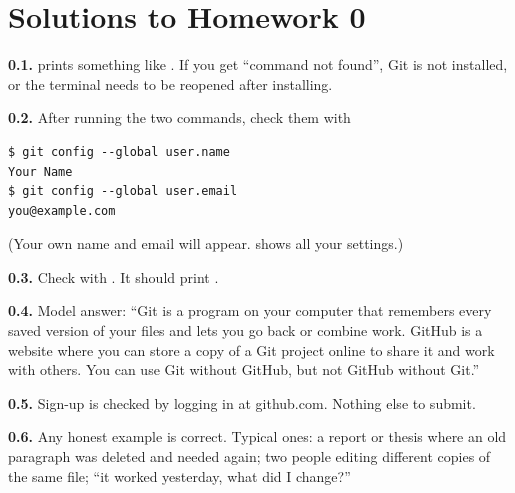 \section*{Solutions to Homework 0}

\textbf{0.1.}  prints something like . If you get ``command not found'', Git is not installed, or the terminal needs to be reopened after installing.

\textbf{0.2.} After running the two commands, check them with
\begin{lstlisting}
$ git config --global user.name
Your Name
$ git config --global user.email
you@example.com
\end{lstlisting}
(Your own name and email will appear.  shows all your settings.)

\textbf{0.3.} Check with . It should print .

\textbf{0.4.} Model answer: ``Git is a program on your computer that remembers every saved version of your files and lets you go back or combine work. GitHub is a website where you can store a copy of a Git project online to share it and work with others. You can use Git without GitHub, but not GitHub without Git.''

\textbf{0.5.} Sign-up is checked by logging in at github.com. Nothing else to submit.

\textbf{0.6.} Any honest example is correct. Typical ones: a report or thesis where an old paragraph was deleted and needed again; two people editing different copies of the same file; ``it worked yesterday, what did I change?''

